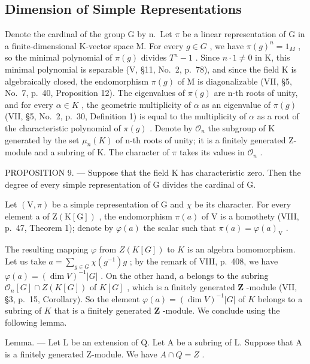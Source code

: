 \subsection{Dimension of Simple Representations}

Denote the cardinal of the group G by n.~Let \(\pi\) be a linear representation of G in a finite-dimensional K-vector space M. For every \(g \in G\) , we have \(\pi(g)^{n} = 1_{M}\) , so the minimal polynomial of \(\pi(g)\) divides \(T^{n} - 1\) . Since \(n \cdot 1 \neq 0\) in K, this minimal polynomial is separable (V, §11, No.~2, p.~78), and since the field K is algebraically closed, the endomorphism \(\pi(g)\) of M is diagonalizable (VII, §5, No.~7, p.~40, Proposition 12). The eigenvalues of \(\pi(g)\) are n-th roots of unity, and for every \(\alpha \in K\) , the geometric multiplicity of \(\alpha\) as an eigenvalue of \(\pi(g)\) (VII, §5, No.~2, p.~30, Definition 1) is equal to the multiplicity of \(\alpha\) as a root of the characteristic polynomial of \(\pi(g)\) . Denote by \(\mathcal{O}_{n}\) the subgroup of K generated by the set \(\mu_{n}(K)\) of n-th roots of unity; it is a finitely generated Z-module and a subring of K. The character of \(\pi\) takes its values in \(\mathcal{O}_{n}\) .

PROPOSITION 9. --- Suppose that the field K has characteristic zero. Then the degree of every simple representation of G divides the cardinal of G.

Let \((\mathrm{V},\pi)\) be a simple representation of G and \(\chi\) be its character. For every element a of \(\mathrm{Z}(\mathrm{K}[\mathrm{G}])\) , the endomorphism \(\pi(a)\) of V is a homothety (VIII, p.~47, Theorem 1); denote by \(\varphi(a)\) the scalar such that \(\pi(a)=\varphi(a)_{\mathrm{V}}\) .

The resulting mapping \(\varphi\) from \(Z(K[G])\) to \(K\) is an algebra homomorphism. Let us take \(a = \sum_{g \in G} \chi(g^{-1})g\) ; by the remark of VIII, p.~408, we have \(\varphi(a) = (\dim V)^{-1}|G|\) . On the other hand, \(a\) belongs to the subring \(\mathcal{O}_n[G] \cap Z(K[G])\) of \(K[G]\) , which is a finitely generated \(\mathbf{Z}\) -module (VII, §3, p.~15, Corollary). So the element \(\varphi(a) = (\dim V)^{-1}|G|\) of \(K\) belongs to a subring of \(K\) that is a finitely generated \(\mathbf{Z}\) -module. We conclude using the following lemma.

Lemma. --- Let L be an extension of Q. Let A be a subring of L. Suppose that A is a finitely generated Z-module. We have \(A \cap Q = Z\) .

